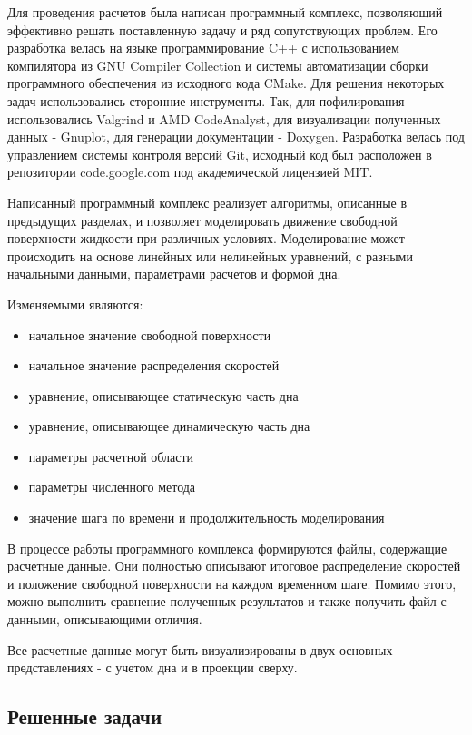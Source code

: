 Для проведения расчетов была написан программный комплекс, позволяющий эффективно решать поставленную задачу и ряд сопутствующих проблем. Его разработка велась на языке программирование C++ с использованием компилятора из GNU Compiler Collection и системы автоматизации сборки программного обеспечения из исходного кода CMake. Для решения некоторых задач использовались сторонние инструменты. Так, для пофилирования использовались Valgrind и AMD CodeAnalyst, для визуализации полученных данных - Gnuplot, для генерации документации - Doxygen. Разработка велась под управлением системы контроля версий Git, исходный код был расположен в репозитории code.google.com под академической лицензией MIT.

Написанный программный комплекс	реализует алгоритмы, описанные в предыдущих разделах, и позволяет моделировать движение свободной поверхности жидкости при различных условиях. Моделирование может происходить на основе линейных или нелинейных уравнений, с разными начальными данными, параметрами расчетов и формой дна.

Изменяемыми являются:
\begin{itemize}
    \item начальное значение свободной поверхности
    \item начальное значение распределения скоростей
    \item уравнение, описывающее статическую часть дна
    \item уравнение, описывающее динамическую часть дна
    \item параметры расчетной области
    \item параметры численного метода
    \item значение шага по времени и продолжительность моделирования
\end{itemize}

В процессе работы программного комплекса формируются файлы, содержащие расчетные данные. Они полностью описывают итоговое распределение скоростей и положение свободной поверхности на каждом временном шаге. Помимо этого, можно выполнить сравнение полученных результатов и также получить файл с данными, описывающими отличия.

Все расчетные данные могут быть визуализированы в двух основных представлениях - с учетом дна и в проекции сверху.

\addtocounter{subsection}{1}
\setcounter{equation}{0}
\subsection*{Решенные задачи}

